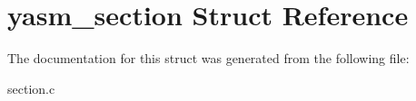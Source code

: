 \hypertarget{structyasm__section}{\section{yasm\-\_\-section Struct Reference}
\label{structyasm__section}
}


The documentation for this struct was generated from the following file\-:\begin{DoxyCompactItemize}
\item 
section.\-c\end{DoxyCompactItemize}
